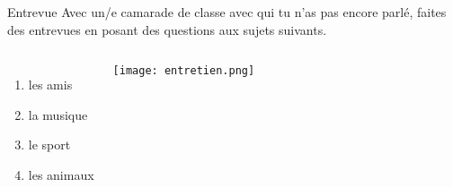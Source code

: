 \begin{frame}{Entrevue}
  Avec un/e camarade de classe avec qui tu n'as pas encore parlé, faites des entrevues en posant des questions aux sujets suivants.  \\
  \begin{columns}
      \begin{enumerate}
        \item les amis
        \item la musique
        \item le sport
        \item les animaux
      \end{enumerate}
      \begin{center}
        \texttt{[image: entretien.png]}
      \end{center}
  \end{columns}
\end{frame}